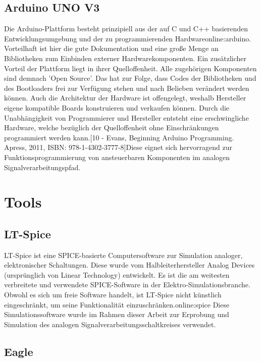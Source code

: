 \subsection{Arduino UNO V3}
\label{subsec:Unterabschnitt12}

Die Arduino-Plattform besteht prinzipiell aus der auf C und C++ basierenden Entwicklungsumgebung und der zu programmierenden Hardware\gls{online:arduino}. Vorteilhaft ist hier die gute Dokumentation und eine große Menge an Bibliotheken zum Einbinden externer Hardwarekomponenten. Ein zusätzlicher Vorteil der Plattform liegt in ihrer Quelloffenheit. Alle zugehörigen Komponenten sind demnach 'Open Source'. Das hat zur Folge, dass Codes der Bibliotheken und des Bootloaders frei zur Verfügung stehen und nach Belieben verändert werden können. Auch die Architektur der Hardware ist offengelegt, weshalb Hersteller eigene kompatible Boards konstruieren und verkaufen können. Durch die Unabhängigkeit von Programmierer und Hersteller entsteht eine erschwingliche Hardware, welche bezüglich der Quelloffenheit ohne Einschränkungen programmiert werden kann.[10 - Evans, Beginning Arduino Programming. Apress, 2011, ISBN: 978-1-4302-3777-8]Diese eignet sich hervorragend zur Funktionsprogrammierung von ansteuerbaren Komponenten im analogen Signalverarbeitungspfad.

\section{Tools}       
\subsection{LT-Spice}
\label{subsec:Unterabschnitt12}
LT-Spice ist eine SPICE-basierte Computersoftware zur Simulation analoger, elektronischer Schaltungen. Diese wurde vom Halbleiterhersteller Analog Devices (ursprünglich von Linear Technology) entwickelt. Es ist die am weitesten verbreitete und verwendete SPICE-Software in der Elektro-Simulationsbranche. Obwohl es sich um freie Software handelt, ist LT-Spice nicht künstlich eingeschränkt, um seine Funktionalität einzuschränken.\gls{online:spice} Diese Simulationssoftware wurde im Rahmen dieser Arbeit zur Erprobung und Simulation des analogen Signalverarbeitungsschaltkreises verwendet.

\subsection{Eagle}
\label{subsec:Unterabschnitt12}

